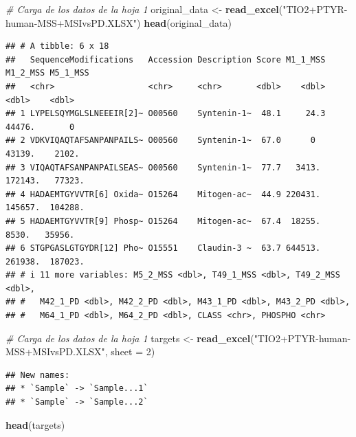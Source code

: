 \documentclass[
]{article}
\newenvironment{Shaded}{\begin{snugshade}}{\end{snugshade}}
\newcommand{\AttributeTok}[1]{\textcolor[rgb]{0.13,0.29,0.53}{#1}}
\newcommand{\CommentTok}[1]{\textcolor[rgb]{0.56,0.35,0.01}{\textit{#1}}}
\newcommand{\DecValTok}[1]{\textcolor[rgb]{0.00,0.00,0.81}{#1}}
\newcommand{\FunctionTok}[1]{\textcolor[rgb]{0.13,0.29,0.53}{\textbf{#1}}}
\newcommand{\NormalTok}[1]{#1}
\newcommand{\OtherTok}[1]{\textcolor[rgb]{0.56,0.35,0.01}{#1}}
\newcommand{\StringTok}[1]{\textcolor[rgb]{0.31,0.60,0.02}{#1}}
\begin{document}
\begin{Shaded}
\begin{Highlighting}[]
\CommentTok{\# Carga de los datos de la hoja 1}
\NormalTok{original\_data }\OtherTok{\textless{}{-}} \FunctionTok{read\_excel}\NormalTok{(}\StringTok{"TIO2+PTYR{-}human{-}MSS+MSIvsPD.XLSX"}\NormalTok{)}
\FunctionTok{head}\NormalTok{(original\_data)}
\end{Highlighting}
\end{Shaded}

\begin{verbatim}
## # A tibble: 6 x 18
##   SequenceModifications   Accession Description Score M1_1_MSS M1_2_MSS M5_1_MSS
##   <chr>                   <chr>     <chr>       <dbl>    <dbl>    <dbl>    <dbl>
## 1 LYPELSQYMGLSLNEEEIR[2]~ O00560    Syntenin-1~  48.1     24.3   44476.       0 
## 2 VDKVIQAQTAFSANPANPAILS~ O00560    Syntenin-1~  67.0      0     43139.    2102.
## 3 VIQAQTAFSANPANPAILSEAS~ O00560    Syntenin-1~  77.7   3413.   172143.   77323.
## 4 HADAEMTGYVVTR[6] Oxida~ O15264    Mitogen-ac~  44.9 220431.   145657.  104288.
## 5 HADAEMTGYVVTR[9] Phosp~ O15264    Mitogen-ac~  67.4  18255.     8530.   35956.
## 6 STGPGASLGTGYDR[12] Pho~ O15551    Claudin-3 ~  63.7 644513.   261938.  187023.
## # i 11 more variables: M5_2_MSS <dbl>, T49_1_MSS <dbl>, T49_2_MSS <dbl>,
## #   M42_1_PD <dbl>, M42_2_PD <dbl>, M43_1_PD <dbl>, M43_2_PD <dbl>,
## #   M64_1_PD <dbl>, M64_2_PD <dbl>, CLASS <chr>, PHOSPHO <chr>
\end{verbatim}

\begin{Shaded}
\begin{Highlighting}[]
\CommentTok{\# Carga de los datos de la hoja 1}
\NormalTok{targets }\OtherTok{\textless{}{-}} \FunctionTok{read\_excel}\NormalTok{(}\StringTok{"TIO2+PTYR{-}human{-}MSS+MSIvsPD.XLSX"}\NormalTok{, }\AttributeTok{sheet =} \DecValTok{2}\NormalTok{)}
\end{Highlighting}
\end{Shaded}

\begin{verbatim}
## New names:
## * `Sample` -> `Sample...1`
## * `Sample` -> `Sample...2`
\end{verbatim}

\begin{Shaded}
\begin{Highlighting}[]
\FunctionTok{head}\NormalTok{(targets)}
\end{Highlighting}
\end{Shaded}
\end{document}
